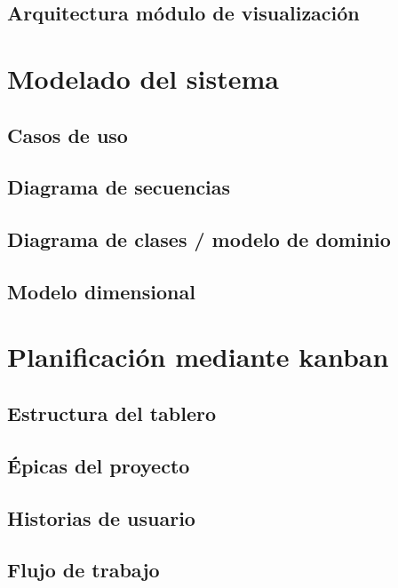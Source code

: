 \documentclass[11pt,oneside,openany]{book}
\begin{document}
\subsection{Arquitectura módulo de visualización}

\section{Modelado del sistema}

\subsection{Casos de uso}

\subsection{Diagrama de secuencias}

\subsection{Diagrama de clases / modelo de dominio}

\subsection{Modelo dimensional}

\section{Planificación mediante kanban}

\subsection{Estructura del tablero}

\subsection{Épicas del proyecto}

\subsection{Historias de usuario}

\subsection{Flujo de trabajo}
\end{document}
